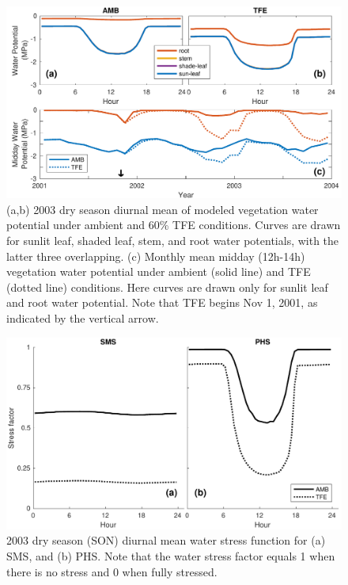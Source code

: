 \documentclass[draft,linenumbers]{agujournal}
\begin{document}
  
    \begin{figure}[h]
     \centering
     \includegraphics[width=30pc]{../figs3/vwp.pdf}
     \caption{(a,b) 2003 dry season diurnal mean of modeled vegetation water potential under ambient and 60\% TFE conditions.
     Curves are drawn for sunlit leaf, shaded leaf, stem, and root water potentials, with the latter three overlapping.
     (c) Monthly mean midday (12h-14h) vegetation water potential under ambient (solid line) and TFE (dotted line) conditions.
     Here curves are drawn only for sunlit leaf and root water potential.
     Note that TFE begins Nov 1, 2001, as indicated by the vertical arrow. 
     }
     \label{fig:vwp}
  \end{figure}

  
    \clearpage
    \begin{figure}[h]
     \centering
     \includegraphics[width=30pc]{../figs3/fig4.pdf}
     \caption{2003 dry season (SON) diurnal mean water stress function for 
     (a) SMS, and
     (b) PHS.
     Note that the water stress factor equals 1 when there is no stress and 0 when fully stressed.
     }
     \label{fig:stress1}
  \end{figure}
  
\end{document}
